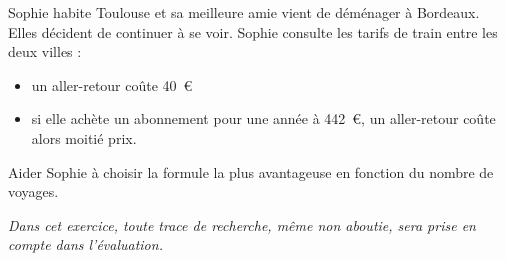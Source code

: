 
\medskip

Sophie habite Toulouse et sa meilleure amie vient de déménager à Bordeaux. Elles
décident de continuer à se voir. Sophie consulte les tarifs de train entre les deux
villes :

\setlength\parindent{8mm}
\begin{itemize}
\item un aller-retour coûte 40~\euro
\item si elle achète un abonnement pour une année à 442~\euro, un aller-retour coûte
alors moitié prix.
\end{itemize}
\setlength\parindent{0mm}

Aider Sophie à choisir la formule la plus avantageuse en fonction du nombre de
voyages.

\emph{Dans cet exercice, toute trace de recherche, même non aboutie, sera prise en
compte dans l'évaluation.}
